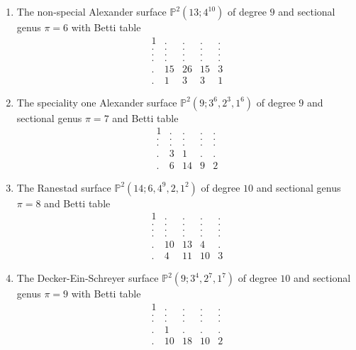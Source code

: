 \documentclass[twoside,12pt, leqno]{amsart}
\def\PP{{\mathbb P}}
\begin{document}
\begin{enumerate}
\item The non-special Alexander surface $\PP^{2}(13;4^{10})$ of degree $9$ and sectional genus $\pi=6$ with Betti table
$$\begin{matrix}
      1 & . & . & . & .\\
       . & . & . & . & .\\
       . & . & . & . & .\\
       . & . & . & . & .\\
       . & 15 & 26 & 15 & 3\\
       . & 1 & 3 & 3 & 1
      \end{matrix}$$

\item The speciality one Alexander surface $\PP^{2}(9;3^{6},2^{3},1^{6})$ of degree $9$ and sectional genus $\pi=7$ and Betti table
$$\begin{matrix}
       1 & . & . & . & .\\
       . & . & . & . & .\\
       . & . & . & . & .\\
       . & 3 & 1 & . & .\\
       . & 6 & 14 & 9 & 2
      \end{matrix}$$



\item The Ranestad surface $\PP^{2}(14;6,4^{9},2,1^{2})$ of degree $10$ and sectional genus $\pi=8$ and Betti table
$$\begin{matrix}
       1 & . & . & . & .\\
        . & . & . & . & .\\
        . & . & . & . & .\\
        . & . & . & . & .\\
        . & 10 & 13 & 4 & .\\
        . & 4 & 11 & 10 & 3
      \end{matrix}$$
      
\item The Decker-Ein-Schreyer surface $\PP^{2}(9;3^{4},2^{7},1^{7})$ of degree $10$ and sectional genus $\pi=9$ with Betti table
 $$\begin{matrix}
 1 & . & . & . & .\\
 . & . & . & . & .\\
 . & . & . & . & .\\
 . & 1 & . & . & .\\
 . & 10 & 18 & 10 & 2
      \end{matrix}$$
      

\end{enumerate}
\end{document}
